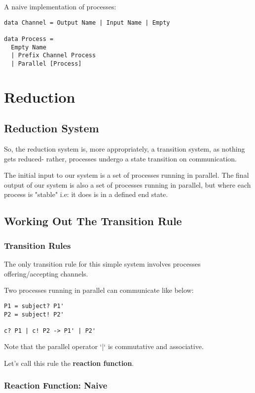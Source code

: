 \documentclass{article}
\begin{document}
A naive implementation of processes: 

\begin{lstlisting}
data Channel = Output Name | Input Name | Empty

data Process =
  Empty Name
  | Prefix Channel Process
  | Parallel [Process]
\end{lstlisting}


\section{Reduction}


\subsection{Reduction System}

So, the reduction system is, more appropriately, a transition system, as nothing gets reduced- rather, processes undergo a state transition on communication.

The initial input to our system is a set of processes running in parallel. The final output of our system is also a set of processes running in parallel, but where each process is "stable" i.e: it does is in a defined end state.

\subsection{Working Out The Transition Rule}

\subsubsection{Transition Rules}

The only transition rule for this simple system involves processes offering/accepting channels.

Two processes running in parallel can communicate like below:

\begin{lstlisting}
P1 = subject? P1'
P2 = subject! P2'

c? P1 | c! P2 -> P1' | P2'
\end{lstlisting}

Note that the parallel operator `|` is commutative and associative.

Let's call this rule the \textbf{reaction function}.

\subsubsection{Reaction Function: Naive}
\end{document}
